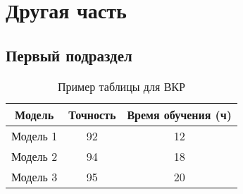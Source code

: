 \section{Другая часть}

\subsection{Первый подраздел}

\begin{table}[h]
    \centering
    \caption{Пример таблицы для ВКР}
    \label{tab:example}
    \begin{tabular}{|c|c|c|}
        \hline
        \textbf{Модель} & \textbf{Точность} & \textbf{Время обучения (ч)} \\ \hline
        Модель 1        & 92                & 12                          \\ \hline
        Модель 2        & 94                & 18                          \\ \hline
        Модель 3        & 95                & 20                          \\ \hline
    \end{tabular}
\end{table}


